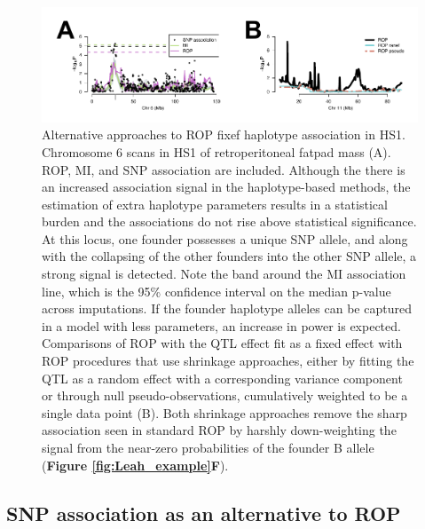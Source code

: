 \begin{figure}
\renewcommand{\familydefault}{\sfdefault}\normalfont
\centering
\includegraphics[width=\textwidth]{figures/4-mi/ROP_alternatives.pdf}
\caption[Alternatives to fixef ROP and fixef MI]{Alternative approaches to ROP fixef haplotype association in HS1. Chromosome 6 scans in HS1 of retroperitoneal fatpad mass (A). ROP, MI, and SNP association are included. Although the there is an increased association signal in the haplotype-based methods, the estimation of extra haplotype parameters results in a statistical burden and the associations do not rise above statistical significance. At this locus, one founder possesses a unique SNP allele, and along with the collapsing of the other founders into the other SNP allele, a strong signal is detected. Note the band around the MI association line, which is the 95\% confidence interval on the median p-value across imputations. If the founder haplotype alleles can be captured in a model with less parameters, an increase in power is expected. Comparisons of ROP with the QTL effect fit as a fixed effect with ROP procedures that use shrinkage approaches, either by fitting the QTL as a random effect with a corresponding variance component or through null pseudo-observations, cumulatively weighted to be a single data point (B). Both shrinkage approaches remove the sharp association seen in standard ROP by harshly down-weighting the signal from the near-zero probabilities of the founder B allele (\textbf{Figure \ref{fig:Leah_example}F}).\label{fig:ROP_alternatives}}
\end{figure}

\subsection{SNP association as an alternative to ROP}

